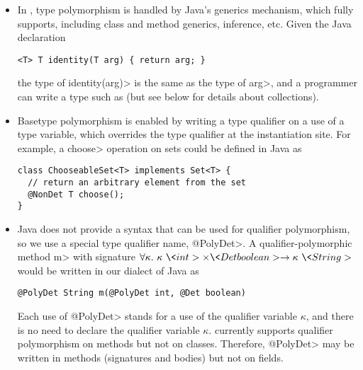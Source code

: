 \begin{itemize}
\item
In \theDeterminismCheckerImplementation,
type polymorphism is handled by Java's generics mechanism, which
\theDeterminismChecker fully supports, including class and method generics,
inference, etc.
Given the Java declaration
\begin{Verbatim}
<T> T identity(T arg) { return arg; }
\end{Verbatim}
the type of \<identity(arg)> is the same as the type of
\<arg>, and a programmer can write a type such as  (but see below for details about collections).
\item
Basetype polymorphism is enabled by writing a type qualifier on a use of a
type variable, which overrides the type qualifier at the instantiation
site.
For example, a \<choose> operation on sets could be defined in Java as
\begin{Verbatim}
class ChooseableSet<T> implements Set<T> {
  // return an arbitrary element from the set
  @NonDet T choose();
}
\end{Verbatim}
\item
Java does not provide a syntax that can be used for qualifier polymorphism,
so we use a special type qualifier name, \<@PolyDet>.
A qualifier-polymorphic method \<m> with signature $\forallt{\kappa} \kappa\ \<int> \times \<Det boolean> \rightarrow
\kappa\ \<String>$ would be written in our dialect of Java as
\begin{Verbatim}
@PolyDet String m(@PolyDet int, @Det boolean)
\end{Verbatim}
Each use of \<@PolyDet> stands for a use of the qualifier variable
$\kappa$, and there is no need to declare the qualifier variable $\kappa$.
\TheDeterminismChecker currently supports
qualifier
polymorphism on methods but not on classes.
Therefore, \<@PolyDet> may be written in methods (signatures and bodies)
but not on fields.
\end{itemize}




